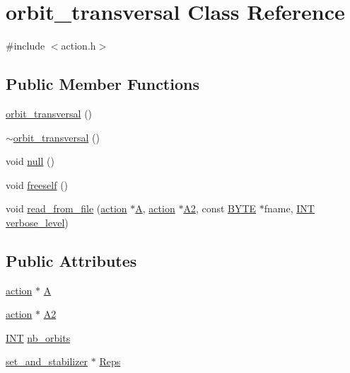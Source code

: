 \hypertarget{classorbit__transversal}{}\section{orbit\+\_\+transversal Class Reference}
\label{classorbit__transversal}


{\ttfamily \#include $<$action.\+h$>$}

\subsection*{Public Member Functions}
\begin{DoxyCompactItemize}
\item 
\mbox{\hyperlink{classorbit__transversal_a952c3c0467594ac16765d2b9a047e5e1}{orbit\+\_\+transversal}} ()
\item 
\mbox{\hyperlink{classorbit__transversal_a7d5af0a1fa3a7697c76474f2e047c5d7}{$\sim$orbit\+\_\+transversal}} ()
\item 
void \mbox{\hyperlink{classorbit__transversal_a8bd5bcab670558a096b18232558dfeae}{null}} ()
\item 
void \mbox{\hyperlink{classorbit__transversal_a41099e8b640c0f98f35475fa28d53adf}{freeself}} ()
\item 
void \mbox{\hyperlink{classorbit__transversal_af88293d7cc859b6202547d60a08c6b59}{read\+\_\+from\+\_\+file}} (\mbox{\hyperlink{classaction}{action}} $\ast$\mbox{\hyperlink{classorbit__transversal_a28099358f8a7e1b4913ab8b2e39a7323}{A}}, \mbox{\hyperlink{classaction}{action}} $\ast$\mbox{\hyperlink{classorbit__transversal_af3de70541aab8c07d8103ab92aff1208}{A2}}, const \mbox{\hyperlink{galois_8h_ab6cc7b4aeb6ea31aba2b3fbfc83ff5e6}{B\+Y\+TE}} $\ast$fname, \mbox{\hyperlink{galois_8h_a09fddde158a3a20bd2dcadb609de11dc}{I\+NT}} \mbox{\hyperlink{simeon_8_c_a818073fbcc2f439e7c56952f67386122}{verbose\+\_\+level}})
\end{DoxyCompactItemize}
\subsection*{Public Attributes}
\begin{DoxyCompactItemize}
\item 
\mbox{\hyperlink{classaction}{action}} $\ast$ \mbox{\hyperlink{classorbit__transversal_a28099358f8a7e1b4913ab8b2e39a7323}{A}}
\item 
\mbox{\hyperlink{classaction}{action}} $\ast$ \mbox{\hyperlink{classorbit__transversal_af3de70541aab8c07d8103ab92aff1208}{A2}}
\item 
\mbox{\hyperlink{galois_8h_a09fddde158a3a20bd2dcadb609de11dc}{I\+NT}} \mbox{\hyperlink{classorbit__transversal_a7d9fe725543916f1b884874cf4decea6}{nb\+\_\+orbits}}
\item 
\mbox{\hyperlink{classset__and__stabilizer}{set\+\_\+and\+\_\+stabilizer}} $\ast$ \mbox{\hyperlink{classorbit__transversal_a04f80e6d4a5aa41c6d5ed4f5425a996e}{Reps}}
\end{DoxyCompactItemize}


